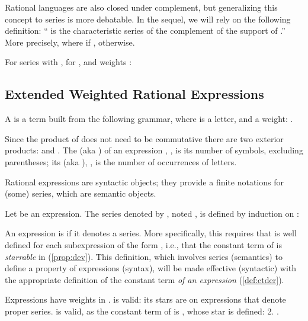 \documentclass[a4paper,USenglish]{lipics}
\begin{document}
Rational languages are also closed under complement, but generalizing this
concept to series is more debatable.  In the sequel, we will rely on the
following definition: `` is the characteristic series of the complement
of the support of .''  More precisely,  where
 if ,  otherwise.

\begin{Proposition}
  \label{prop:series}
  For series  with , for
  , and weights :
  
\end{Proposition}

\subsection{Extended Weighted Rational Expressions}
\label{sec:expr}
\begin{Definition}
  A   is a term built from the
  following grammar, where  is a letter, and  a weight:
  .
\end{Definition}

Since the product of  does not need to be commutative there are two
exterior products:  and .
The  (aka ) of an expression , , is
its number of symbols, excluding parentheses; its  (aka
), , is the number of occurrences of
letters.

Rational expressions are syntactic objects; they provide a finite notations
for (some) series, which are semantic objects.
\begin{Definition}
  Let  be an expression.  The series denoted by , noted
  , is defined by induction on :
  
\end{Definition}
An expression is  if it denotes a series.  More specifically,
this requires that  is well defined for each subexpression of
the form , i.e., that the constant term of  is
\emph{starrable} in  (\cref{prop:dev}).  This definition, which involves
series (semantics) to define a property of expressions (syntax), will be
made effective (syntactic) with the appropriate definition of the constant
term  \emph{of an expression } (\cref{def:ctder}).

\begin{longenv}
\begin{Example}
  \label{ex:e2}
  Expressions  have weights in
  .   is valid: its stars are on expressions that denote proper
  series.   is valid, as the constant term of  is
  , whose star is defined:
  2. .
\end{Example}
\end{longenv}
\end{document}
